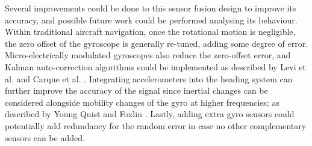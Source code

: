 Several improvements could be done to this sensor fusion design to improve its accuracy, and possible future work could be performed analysing its behaviour. Within traditional aircraft navigation, once the rotational motion is negligible, the zero offset of the gyroscope is generally re-tuned, adding some degree of error. Micro-electrically modulated gyroscopes also reduce the zero-offset error, and Kalman auto-correction algorithms could be implemented as described by Levi et al. \cite{levi2005gyro} and Carque et al. \cite{carque2011sensor}. Integrating accelerometers into the heading system can further improve the accuracy of the signal since inertial changes can be considered alongside mobility changes of the gyro at higher frequencies; as described by Young Quist \cite{youngquist1997rate} and Foxlin \cite{foxlin1996inertial}. Lastly, adding extra gyro sensors could potentially add redundancy for the random error in case no other complementary sensors can be added.










